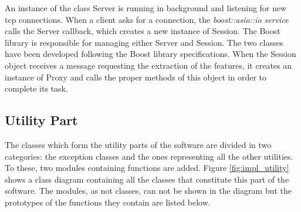 		An instance of the class Server is running in background and listening for new tcp connections. 
		When a client asks for a connection, the \emph{boost::asio::io service} calls the Server callback, which creates a new instance of Session.
		The Boost library is responsible for managing either Server and Session.
		The two classes have been developed following the Boost library specifications.
		When the Session object receives a message requesting the extraction of the features, it creates an instance of Proxy and calls the proper methods of this object in order to complete its task.


		\subsection{Utility Part}
		The classes which form the utility parts of the software are divided in two categories: the exception classes and the ones representing all the other utilities. 
		To these, two modules containing functions are added. 
		Figure \ref{fig:impl_utility} shows a class diagram containing all the classes that constitute this part of the software. 
		The modules, as not classes, can not be shown in the diagram but the prototypes of the functions they contain are listed below.
		
